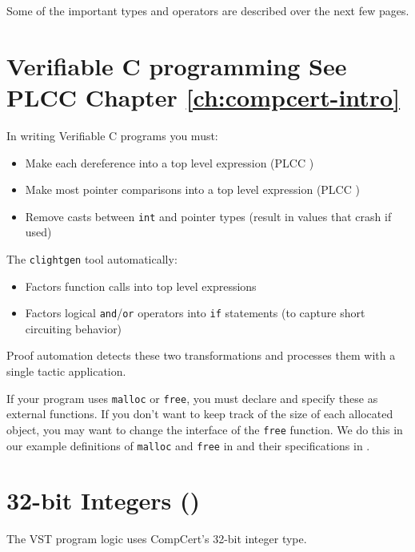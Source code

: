 \documentclass[12pt,fleqn,openany,oneside,showtrims]{memoir}
\newcommand{\ychapter}[2]{\chapter[#1]{#1 \hfill \normalsize #2}}
\begin{document}
Some of the important types and operators are described over the next 
few pages.

\ychapter{Verifiable C programming}{See PLCC Chapter \ref{ch:compcert-intro}}
\label{refcard:verifiable-c}
In writing Verifiable C programs you must:

\begin{itemize}
  \item Make each dereference into a top level expression (PLCC
  )
  \item Make most pointer comparisons into a top level expression (PLCC
  )
  \item Remove casts between \lstinline|int| and pointer types (result in
  values that crash if used)
\end{itemize}

The \lstinline{clightgen} tool automatically:

\begin{itemize}
  \item Factors function calls into top level expressions
  \item Factors logical \lstinline{and}/\lstinline{or} operators into 
\lstinline{if} statements (to capture
  short circuiting behavior)
\end{itemize}

Proof automation detects these two transformations and processes them with a
single tactic application.

If your program uses \lstinline|malloc| or \lstinline|free|, you must declare
and specify these as external functions. If you don't want to keep track of the
size of each allocated object, you may want to change the interface of the
\lstinline|free| function. We do this in our example definitions of
\lstinline|malloc| and \lstinline|free| in  and their
specifications in .

\ychapter{32-bit Integers}{()}

The VST program logic uses CompCert's 32-bit integer type.
\end{document}
